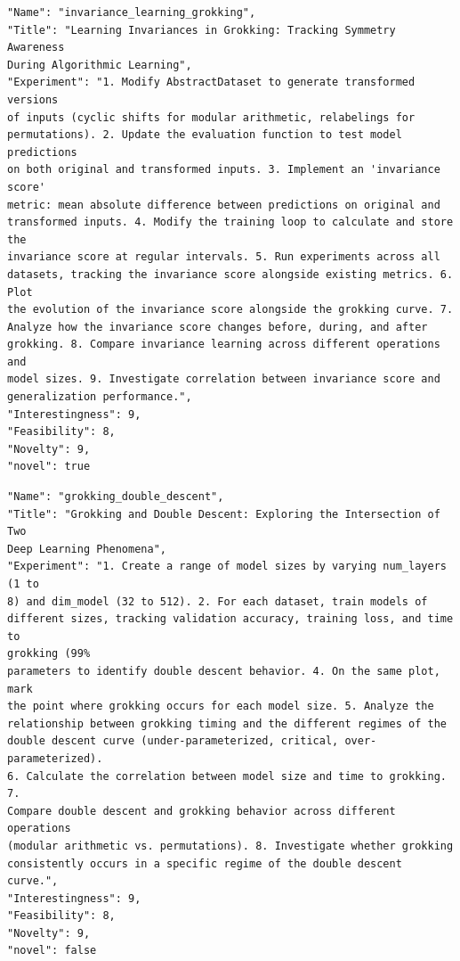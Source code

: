 \begin{tcolorbox}[breakable,colback=blue!5!white, colframe=blue!75!black, title=Idea 23/50 - \texttt{invariance\_learning\_grokking}]
\small
\begin{verbatim}
"Name": "invariance_learning_grokking",
"Title": "Learning Invariances in Grokking: Tracking Symmetry Awareness
During Algorithmic Learning",
"Experiment": "1. Modify AbstractDataset to generate transformed versions
of inputs (cyclic shifts for modular arithmetic, relabelings for
permutations). 2. Update the evaluation function to test model predictions
on both original and transformed inputs. 3. Implement an 'invariance score'
metric: mean absolute difference between predictions on original and
transformed inputs. 4. Modify the training loop to calculate and store the
invariance score at regular intervals. 5. Run experiments across all
datasets, tracking the invariance score alongside existing metrics. 6. Plot
the evolution of the invariance score alongside the grokking curve. 7.
Analyze how the invariance score changes before, during, and after
grokking. 8. Compare invariance learning across different operations and
model sizes. 9. Investigate correlation between invariance score and
generalization performance.",
"Interestingness": 9,
"Feasibility": 8,
"Novelty": 9,
"novel": true
\end{verbatim}
\end{tcolorbox}

\begin{tcolorbox}[breakable,colback=blue!5!white, colframe=blue!75!black, title=Idea 24/50 - \texttt{grokking\_double\_descent}]
\small
\begin{verbatim}
"Name": "grokking_double_descent",
"Title": "Grokking and Double Descent: Exploring the Intersection of Two
Deep Learning Phenomena",
"Experiment": "1. Create a range of model sizes by varying num_layers (1 to
8) and dim_model (32 to 512). 2. For each dataset, train models of
different sizes, tracking validation accuracy, training loss, and time to
grokking (99%
parameters to identify double descent behavior. 4. On the same plot, mark
the point where grokking occurs for each model size. 5. Analyze the
relationship between grokking timing and the different regimes of the
double descent curve (under-parameterized, critical, over-parameterized).
6. Calculate the correlation between model size and time to grokking. 7.
Compare double descent and grokking behavior across different operations
(modular arithmetic vs. permutations). 8. Investigate whether grokking
consistently occurs in a specific regime of the double descent curve.",
"Interestingness": 9,
"Feasibility": 8,
"Novelty": 9,
"novel": false
\end{verbatim}
\end{tcolorbox}

